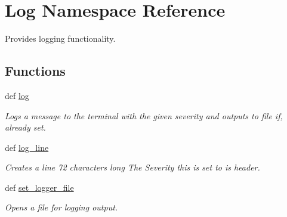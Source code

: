 \hypertarget{namespaceLog}{\section{Log Namespace Reference}
\label{namespaceLog}
}


Provides logging functionality.  


\subsection*{Functions}
\begin{DoxyCompactItemize}
\item 
def \hyperlink{namespaceLog_a835d36011fd11bf38f4aa2749da19af4}{log}
\begin{DoxyCompactList}\small\item\em Logs a message to the terminal with the given severity and outputs to file if, already set. \end{DoxyCompactList}\item 
\hypertarget{namespaceLog_a27e46a659e378b038ea6416d14f9334e}{def \hyperlink{namespaceLog_a27e46a659e378b038ea6416d14f9334e}{log\-\_\-line}}\label{namespaceLog_a27e46a659e378b038ea6416d14f9334e}

\begin{DoxyCompactList}\small\item\em Creates a line 72 characters long The Severity this is set to is header. \end{DoxyCompactList}\item 
def \hyperlink{namespaceLog_aa9fb9b162890fd1228e0669b97176590}{set\-\_\-logger\-\_\-file}
\begin{DoxyCompactList}\small\item\em Opens a file for logging output. \end{DoxyCompactList}\end{DoxyCompactItemize}
